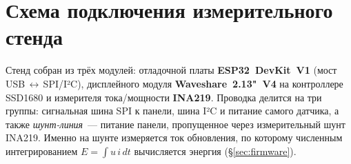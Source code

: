 \chapter{Схема подключения измерительного стенда}\label{app:wiring}

Стенд собран из трёх модулей: отладочной платы \textbf{ESP32~DevKit~V1}
(мост USB\,$\leftrightarrow$\,SPI/I²C), дисплейного модуля
\textbf{Waveshare~2.13"~V4} на контроллере SSD1680 и измерителя тока/мощности
\textbf{INA219}. Проводка делится на три группы: сигнальная шина SPI к панели,
шина I²C и питание самого датчика, а также \emph{шунт-линия}~--- питание панели,
пропущенное через измерительный шунт INA219. Именно на шунте измеряется ток
обновления, по которому численным интегрированием $E=\int u\,i\,dt$ вычисляется
энергия (\S\ref{sec:firmware}).

